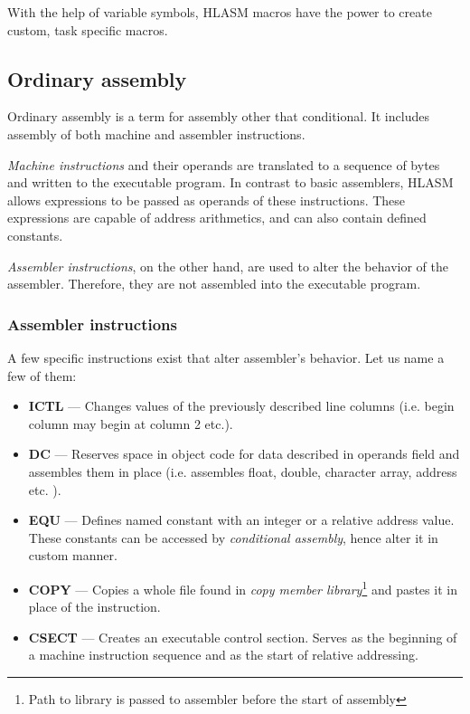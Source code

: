 With the help of variable symbols, HLASM macros have the power to create custom, task specific macros.

\subsection{Ordinary assembly}

Ordinary assembly is a term for assembly other that conditional. It includes assembly of both machine and assembler instructions. 

\emph{Machine instructions} and their operands are translated to a sequence of bytes and written to the executable program. In contrast to basic assemblers, HLASM allows expressions to be passed as operands of these instructions. These expressions are capable of address arithmetics, and can also contain defined constants.

\emph{Assembler instructions}, on the other hand, are used to alter the behavior of the assembler. Therefore, they are not assembled into the executable program.

\subsubsection{Assembler instructions}

A few specific instructions exist that alter assembler's behavior. Let us name a few of them:
\begin{itemize}
	\item \textbf{ICTL} --- Changes values of the previously described line columns (i.e. begin column may begin at column 2 etc.).
	
	\item \textbf{DC} --- Reserves space in object code for data described in operands field and assembles them in place (i.e. assembles float, double, character array, address etc. ).
	
	\item \textbf{EQU} --- Defines named constant with an integer or a relative address value. These constants can be accessed by \textit{conditional assembly}, hence alter it in custom manner.
	
	\item \textbf{COPY} --- Copies a whole file found in \textit{copy member library}\footnote{Path to library is passed to assembler before the start of assembly} and pastes it in place of the instruction.
	
	\item \textbf{CSECT} --- Creates an executable control section. Serves as the beginning of a machine instruction sequence and as the start of relative addressing.
\end{itemize}

